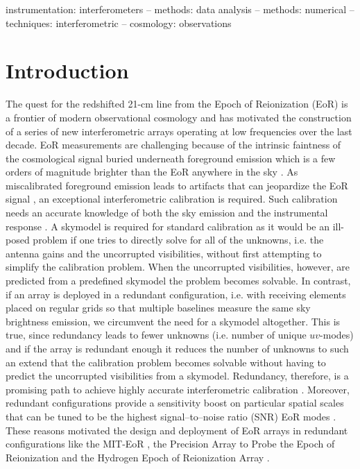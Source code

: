 \documentclass[useAMS,usenatbib]{mn2e}
\begin{document}
\begin{abstract}
\end{abstract}


\begin{keywords}
instrumentation: interferometers -- methods: data analysis -- methods: numerical --techniques: interferometric -- cosmology: observations
\end{keywords}

\section{Introduction}
The quest for the redshifted 21-cm line from the Epoch of Reionization (EoR) is a frontier of modern observational cosmology and has motivated the construction of a series of new interferometric arrays operating at low frequencies over the last decade. EoR measurements are challenging because of the intrinsic faintness of the cosmological signal \citep[see, for instance,][for recent reviews]{Furlanetto2016,McQuinn2016} buried underneath foreground emission which is a few orders of magnitude brighter than the EoR anywhere in the sky \citep[e.g.,][]{Bernardi2009,Bernardi2010,Ghosh2012,Dillon2014,Parsons2014}. 
As miscalibrated foreground emission leads to artifacts that can jeopardize the EoR signal \citep[e.g.,][]{grobler2014,barry2016,ewall-wice2016}, an exceptional interferometric calibration is required. Such calibration needs an accurate knowledge of both the sky emission and the instrumental response \citep[e.g.,][]{Smirnov2011c}.
A skymodel is required for standard calibration as it would be an ill-posed problem if one tries to directly solve for all of the unknowns, i.e. the antenna gains and the uncorrupted 
visibilities, without first attempting to simplify the calibration problem. When the uncorrupted visibilities, however, are predicted from a predefined skymodel the problem becomes solvable.
In contrast, if an array is deployed in a redundant configuration, i.e. with receiving elements placed on regular grids so that multiple baselines measure the same sky brightness emission,
we circumvent the need for a skymodel altogether. This is true, since redundancy leads to fewer unknowns (i.e. number of unique 
$uv$-modes) and if the array is redundant enough it reduces the number of unknowns to such an extend that the calibration problem becomes solvable without having to predict the uncorrupted visibilities from a skymodel. Redundancy, therefore, is a promising path to achieve highly accurate interferometric calibration \citep[][]{Noordam1982,Wieringa1992,Pearson1984,Liu2010,Noorishad2012,Marthi2014,Sievers2017}. 
Moreover, redundant configurations provide a sensitivity boost on particular spatial scales that can be tuned to be the highest signal--to--noise ratio (SNR) EoR modes \citep[][]{Parsons2012,Dillon2016}. These reasons motivated the design and deployment of EoR arrays in redundant configurations like the MIT-EoR \citep{Zheng2014}, the Precision Array to Probe the Epoch of Reionization \citep[PAPER,][]{Ali2015} and the Hydrogen Epoch of Reionization Array \citep[HERA,][]{deboer2017}. 
\end{document}
